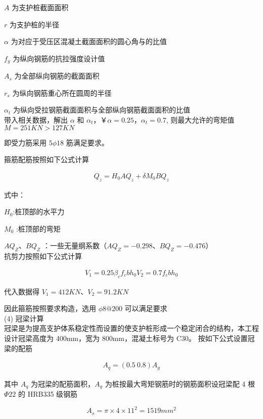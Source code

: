 $A$ 为支护桩截面面积

$r$ 为支护桩的半径

$\alpha $ 为对应于受压区混凝土截面面积的圆心角与的比值

$f_y$ 为纵向钢筋的抗拉强度设计值

$A_s$ 为全部纵向钢筋的截面面积

$r_s$ 为纵向钢筋重心所在圆周的半径

$\alpha_t$ 为纵向受拉钢筋截面面积与全部纵向钢筋截面面积的比值\\

带入相关数据，解出 $\alpha \text{ 和 } \alpha_t$，￥$\alpha=0.25$，$\alpha_t=0.7$,
则最大允许的弯矩值 $M=251 KN > 127 KN$

即受力筋采用 $5\phi 18$ 筋满足要求。

箍筋配筋按照如下公式计算

\begin{align}
    \label{fx:6.8}
    Q_z=H_0AQ_z+\delta M_0BQ_z
\end{align}

式中：

$H_0$:桩顶部的水平力

$M_0$ :桩顶部的弯矩

$AQ_Z$、$BQ_Z$ ：一些无量纲系数（$AQ_Z=-0.298$、$BQ_Z=-0.476$）\\

抗剪力按照如下公式计算

\begin{align}
    \label{fx:6.8A}
    V_1=0.25 \beta_cf_cbh_0
    V_2=0.7 f_cbh_0
\end{align}

代入数据得 $V_1=412KN$、$V_2=91.2KN$

因此箍筋按照要求构造，选用 $\phi8@200$ 可以满足要求\\

(4) 冠梁计算\\

冠梁是为提高支护体系稳定性而设置的使支护桩形成一个稳定闭合的结构，本工程设计冠梁高度为 400mm，宽为 800mm，混凝土标号为 C30。
按如下公式设置冠梁的配筋

\begin{align}
    \label{fx:6.9}
    A_q=(0.5~0.8)A_g
\end{align}

其中 $A_q$ 为冠梁的配筋面积，$A_g$ 为桩按最大弯矩钢筋时的钢筋面积设冠梁配 4 根 $\Phi22$ 的 HRB335 级钢筋

\[A_s=\pi \times 4\times 11^2=1519 mm^2\]

